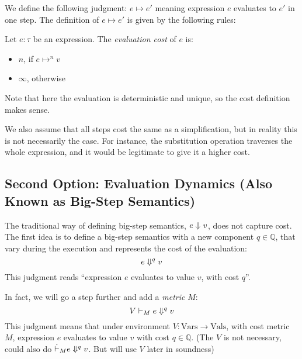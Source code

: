 \documentclass[ manuscript,screen, nonacm]{acmart}
\begin{document}
We define the following judgment: $e \mapsto e'$ meaning expression $e$ evaluates to $e'$ in one step. The definition of \(e \mapsto e'\) is given by the following rules:


\begin{definition}\label{def:cost-small-step}
Let $e:\tau$ be an expression. 
The \emph{evaluation cost} of $e$ is:
\begin{itemize}
    \item $n$, if $e \mapsto ^n v$
    \item $\infty$, otherwise
\end{itemize}
\end{definition}
Note that here the evaluation is deterministic and unique, so the cost definition makes sense.

\begin{remark*}
We also assume that all steps cost the same as a simplification, but in reality this is not necessarily the case. For instance, the substitution operation traverses the whole expression, and it would be legitimate
to give it a higher cost.
\end{remark*}

\subsection{Second Option: Evaluation Dynamics (Also Known as Big-Step Semantics)}

The traditional way of defining big-step semantics, \(e \Downarrow^{} v\), does not capture cost.
The first idea is to define a big-step semantics with a new component \(q \in \mathbb{Q}\), that vary during
the execution and represents the cost of the evaluation:
\[
 e \Downarrow^{q} v
\]
This judgment reads ``expression $e$ evaluates to value $v$, with cost $q$''.

In fact, we will go a step further and add a \emph{metric} \(M\):
\[
  V \vdash_{M} e \Downarrow^{q}v
\]
This judgment means that under environment $V: \mathrm{Vars} \rightarrow \mathrm{Vals}$, with cost metric $M$,
expression $e$ evaluates to value $v$ with cost $q \in \mathbb{Q}$.
(The $V$ is not necessary, could also do $\dot \vdash_{M} e \Downarrow^{q}v$. But will use $V$ later in soundness)
\end{document}
